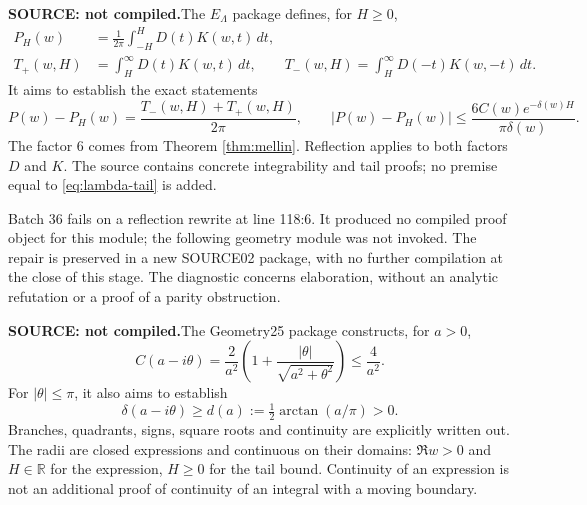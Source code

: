 \documentclass[11pt,a4paper]{article}
\theoremstyle{remark}
\newcommand{\Lam}{\Lambda}
\newcommand{\R}{\mathbb R}
\newcommand{\source}{\textbf{SOURCE: not compiled.}\space}
\begin{document}
\source The $E_\Lam$ package defines, for $H\ge0$,
\begin{align}
P_H(w)&=\frac1{2\pi}\int_{-H}^{H}D(t)K(w,t)\,dt,\\
T_+(w,H)&=\int_H^\infty D(t)K(w,t)\,dt,\qquad
T_-(w,H)=\int_H^\infty D(-t)K(w,-t)\,dt.
\end{align}
It aims to establish the exact statements
\begin{equation}\label{eq:lambda-tail}
P(w)-P_H(w)=\frac{T_-(w,H)+T_+(w,H)}{2\pi},\qquad
|P(w)-P_H(w)|\le
\frac{6C(w)e^{-\delta(w)H}}{\pi\delta(w)}.
\end{equation}
The factor 6 comes from Theorem \ref{thm:mellin}. Reflection applies to both
factors $D$ and $K$. The source contains concrete integrability and tail
proofs; no premise equal to \eqref{eq:lambda-tail} is added.

Batch 36 fails on a reflection rewrite at line 118:6. It produced no compiled
proof object for this module; the following geometry module was not invoked.
The repair is preserved in a new SOURCE02 package, with no further compilation
at the close of this stage. The diagnostic concerns elaboration, without
an analytic refutation or a proof of a parity obstruction.

\source The Geometry25 package constructs, for $a>0$,
\begin{equation}\label{eq:geometry}
C(a-i\theta)=\frac2{a^2}
\left(1+\frac{|\theta|}{\sqrt{a^2+\theta^2}}\right)\le\frac4{a^2}.
\end{equation}
For $|\theta|\le\pi$, it also aims to establish
\begin{equation}\label{eq:d}
\delta(a-i\theta)\ge d(a):=\tfrac12\arctan(a/\pi)>0.
\end{equation}
Branches, quadrants, signs, square roots and continuity are explicitly
written out. The radii are closed expressions and continuous on their domains:
$\Re w>0$ and $H\in\R$ for the expression, $H\ge0$ for the tail bound.
Continuity of an expression is not an additional proof of continuity of
an integral with a moving boundary.

\clearpage
\end{document}
